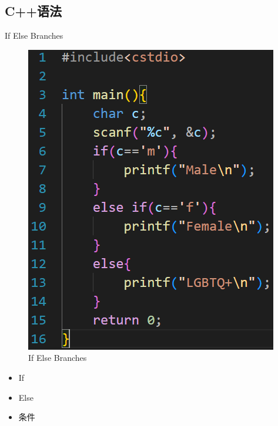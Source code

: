\documentclass{beamer}
\begin{document}
\subsection{C++语法}
\begin{frame}{If Else Branches}
    \begin{minipage}{0.45\linewidth}
        \begin{figure}
        \centering
        \includegraphics[width=\linewidth]{pic/If Else Branches.png}
        \caption{If Else Branches}
        \label{fig:If_Else_Branches}
    \end{figure}
    \end{minipage}
    \hspace{1cm}
    \begin{minipage}{0.37\linewidth}
        \begin{itemize}
            \item If
            \item Else
            \item 条件
        \end{itemize}
    \end{minipage}
\end{frame}
\end{document}
